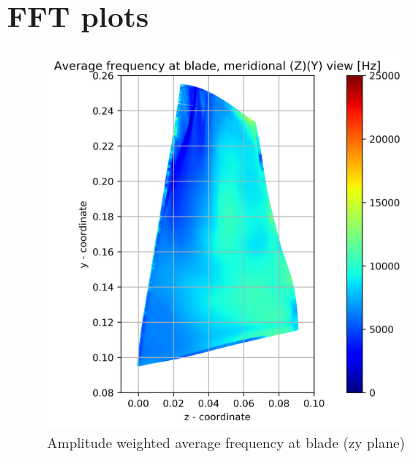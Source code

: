 
\chapter{FFT plots} %

\label{fft_results} %


\begin{figure}[ht]
	\centering
	\includegraphics[width=0.85\textwidth]{Figures/blade-zy-awaf.png}
    \caption{Amplitude weighted average frequency at blade (zy plane)} \label{blade-zy-awaf}
\end{figure}	

